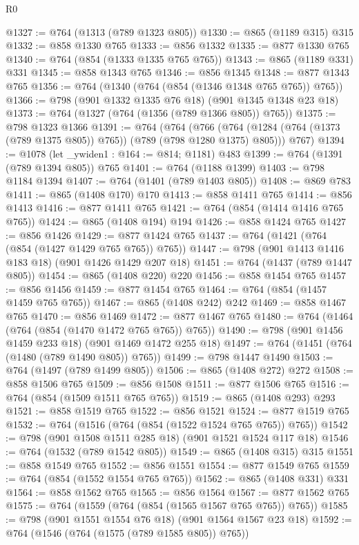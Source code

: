 \begin{lexlean}{R0}
\begin{coremodule}
@1327 := @764 (@1313 (@789 @1323 @805))
@1330 := @865 (@1189 @315) @315
@1332 := @858 @1330 @765
@1333 := @856 @1332
@1335 := @877 @1330 @765
@1340 := @764 (@854 (@1333 @1335 @765 @765))
@1343 := @865 (@1189 @331) @331
@1345 := @858 @1343 @765
@1346 := @856 @1345
@1348 := @877 @1343 @765
@1356 := @764 (@1340 (@764 (@854 (@1346 @1348 @765 @765)) @765))
@1366 := @798 (@901 @1332 @1335 @76 @18) (@901 @1345 @1348 @23 @18)
@1373 := @764 (@1327 (@764 (@1356 (@789 @1366 @805)) @765))
@1375 := @798 @1323 @1366
@1391 := @764
    (@764
      (@766 (@764 (@1284 (@764 (@1373 (@789 @1375 @805)) @765)) (@789 (@798 @1280 @1375) @805)))
      @767)
@1394 := @1078 (let _ywiden1 : @164 := @814; @1181) @483
@1399 := @764 (@1391 (@789 @1394 @805)) @765
@1401 := @764 (@1188 @1399)
@1403 := @798 @1184 @1394
@1407 := @764 (@1401 (@789 @1403 @805))
@1408 := @869 @783
@1411 := @865 (@1408 @170) @170
@1413 := @858 @1411 @765
@1414 := @856 @1413
@1416 := @877 @1411 @765
@1421 := @764 (@854 (@1414 @1416 @765 @765))
@1424 := @865 (@1408 @194) @194
@1426 := @858 @1424 @765
@1427 := @856 @1426
@1429 := @877 @1424 @765
@1437 := @764 (@1421 (@764 (@854 (@1427 @1429 @765 @765)) @765))
@1447 := @798 (@901 @1413 @1416 @183 @18) (@901 @1426 @1429 @207 @18)
@1451 := @764 (@1437 (@789 @1447 @805))
@1454 := @865 (@1408 @220) @220
@1456 := @858 @1454 @765
@1457 := @856 @1456
@1459 := @877 @1454 @765
@1464 := @764 (@854 (@1457 @1459 @765 @765))
@1467 := @865 (@1408 @242) @242
@1469 := @858 @1467 @765
@1470 := @856 @1469
@1472 := @877 @1467 @765
@1480 := @764 (@1464 (@764 (@854 (@1470 @1472 @765 @765)) @765))
@1490 := @798 (@901 @1456 @1459 @233 @18) (@901 @1469 @1472 @255 @18)
@1497 := @764 (@1451 (@764 (@1480 (@789 @1490 @805)) @765))
@1499 := @798 @1447 @1490
@1503 := @764 (@1497 (@789 @1499 @805))
@1506 := @865 (@1408 @272) @272
@1508 := @858 @1506 @765
@1509 := @856 @1508
@1511 := @877 @1506 @765
@1516 := @764 (@854 (@1509 @1511 @765 @765))
@1519 := @865 (@1408 @293) @293
@1521 := @858 @1519 @765
@1522 := @856 @1521
@1524 := @877 @1519 @765
@1532 := @764 (@1516 (@764 (@854 (@1522 @1524 @765 @765)) @765))
@1542 := @798 (@901 @1508 @1511 @285 @18) (@901 @1521 @1524 @117 @18)
@1546 := @764 (@1532 (@789 @1542 @805))
@1549 := @865 (@1408 @315) @315
@1551 := @858 @1549 @765
@1552 := @856 @1551
@1554 := @877 @1549 @765
@1559 := @764 (@854 (@1552 @1554 @765 @765))
@1562 := @865 (@1408 @331) @331
@1564 := @858 @1562 @765
@1565 := @856 @1564
@1567 := @877 @1562 @765
@1575 := @764 (@1559 (@764 (@854 (@1565 @1567 @765 @765)) @765))
@1585 := @798 (@901 @1551 @1554 @76 @18) (@901 @1564 @1567 @23 @18)
@1592 := @764 (@1546 (@764 (@1575 (@789 @1585 @805)) @765))

\end{coremodule}
\end{lexlean}
